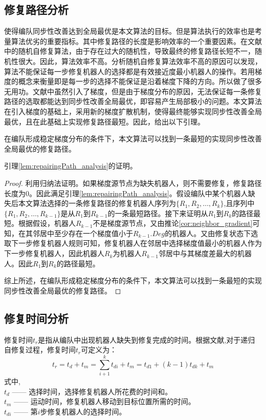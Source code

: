 \subsection{修复路径分析}
使得编队同步性改善达到全局最优是本文算法的目标。但是算法执行的效率也是考量算法优劣的重要指标。其中修复路径的长度是影响效率的一个重要因素。在文献\parencite{张飞2008移动机器人覆盖问题的研究}中的随机自修复算法，由于存在过大的随机性，导致最终的修复路径长短不一，随机性很大。因此，算法效率不高。分析随机自修复算法效率不高的原因可以发现，算法不能保证每一步修复机器人的选择都是有效接近度最小机器人的操作。若用梯度的概念来衡量即是每一步的选择不能保证是沿着梯度下降的方向。所以做了很多无用功。文献\parencite{liu2015gradient}中虽然引入了梯度，但是由于梯度分布的原因，无法保证每一条修复路径的选取都能达到同步性改善全局最优，即容易产生局部极小的问题。本文算法在引入梯度的基础上，采用新的梯度扩散机制，使得最终能够实现同步性改善全局最优，且在此基础上实现修复路径最短。因此，给出以下引理。
\begin{lem}
	\label{lem:repairingPath_analysis}
	在编队形成稳定梯度分布的条件下，本文算法可以找到一条最短的实现同步性改善全局最优的修复路径。
	
	引理\ref{lem:repairingPath_analysis}的证明。
	
	\begin{proof}
		利用归纳法证明。如果梯度源节点为缺失机器人，则不需要修复，修复路径长度为$0$。因此满足引理\ref{lem:repairingPath_analysis}。假设编队中某个机器人缺失后本文算法选择的一条修复路径的修复机器人序列为$\{R_1,R_2,\dots,R_k \}$,且序列中$\{R_1,R_2,\dots,R_{k-1} \}$是从$R_1$到$R_{k-1}$的一条最短路径。接下来证明从$R_1$到$R_k$的路径最短。根据假设，机器人$R_{k-1}$不是梯度源节点，又由推论\ref{cor:neighbor_gradient}可知，在其邻居中至少存在一个梯度值小于$R_{k-1}.Deg$的机器人。又由修复状态下选取下一步修复机器人规则可知，修复机器人在邻居中选择梯度值最小的机器人作为下一步修复机器人，因此机器人$R_k$为机器人$R_{k-1}$邻居中与其梯度差最大的机器人。因此$R_1$到$R_k$的路径最短。
		
		综上所述，在编队形成稳定梯度分布的条件下，本文算法可以找到一条最短的实现同步性改善全局最优的修复路径。
	\end{proof}
\end{lem}

\subsection{修复时间分析}
修复时间$t_r$是指从编队中出现机器人缺失到修复完成的时间。根据文献\parencite{张飞2008移动机器人覆盖问题的研究},对于递归自修复过程，修复时间$t_r$可定义为：
\begin{equation}
	t_r = t_d + t_m = \sum_{i+1}^k t_{di} + t_m = t_{d1} + (k-1)t_{dk} + t_m
\end{equation}
式中,\\
\indent $t_d$ —— 选择时间，选择修复机器人所花费的时间和。\\
\indent $t_m$ —— 运动时间，修复机器人移动到目标位置所需的时间。\\
\indent $t_{di}$ —— 第$i$步修复机器人的选择时间。

